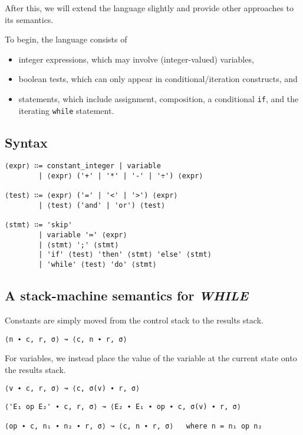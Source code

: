 \documentclass[11pt]{article}
\theoremstyle{definition}
\begin{document}
After this, we will extend the language slightly
and provide other approaches to its semantics.

To begin, the language consists of
\begin{itemize}
\item integer expressions, which may involve (integer-valued) variables,
\item boolean tests, which can only appear in conditional/iteration constructs, and
\item statements, which include assignment, composition, a conditional \texttt{if},
and the iterating \texttt{while} statement.
\end{itemize}

\subsection{Syntax}
\label{sec:orga8c34ba}
\begin{verbatim}
⟨expr⟩ ∷= constant_integer | variable
        | ⟨expr⟩ ('+' | '*' | '-' | '÷') ⟨expr⟩

⟨test⟩ ∷= ⟨expr⟩ ('=' | '<' | '>') ⟨expr⟩
        | ⟨test⟩ ('and' | 'or') ⟨test⟩

⟨stmt⟩ ∷= 'skip'
        | variable '≔' ⟨expr⟩
        | ⟨stmt⟩ ';' ⟨stmt⟩
        | 'if' ⟨test⟩ 'then' ⟨stmt⟩ 'else' ⟨stmt⟩
        | 'while' ⟨test⟩ 'do' ⟨stmt⟩
\end{verbatim}

\subsection{A stack-machine semantics for \emph{WHILE}}
\label{sec:org6abbb62}
Constants are simply moved from the control stack to the results stack.
\begin{verbatim}
⟨n ∙ c, r, σ⟩ ↝ ⟨c, n ∙ r, σ⟩
\end{verbatim}

For variables, we instead place the value of the variable
at the current state onto the results stack.
\begin{verbatim}
⟨v ∙ c, r, σ⟩ ↝ ⟨c, σ(v) ∙ r, σ⟩
\end{verbatim}

\begin{verbatim}
⟨'E₁ op E₂' ∙ c, r, σ⟩ ↝ ⟨E₂ ∙ E₁ ∙ op ∙ c, σ(v) ∙ r, σ⟩

⟨op ∙ c, n₁ ∙ n₂ ∙ r, σ⟩ ↝ ⟨c, n ∙ r, σ⟩   where n = n₁ op n₂
\end{verbatim}
\end{document}
